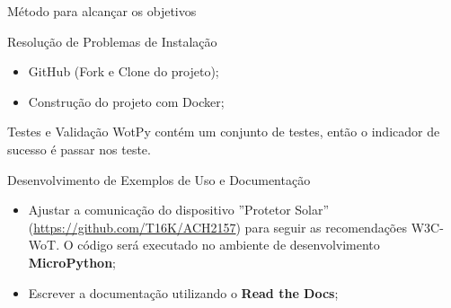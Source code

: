 \begin{frame}{Método para alcançar os objetivos}

    \begin{block}{Resolução de Problemas de Instalação}
        \begin{itemize}
            \item GitHub (Fork e Clone do projeto);
            \item Construção do projeto com Docker;
        \end{itemize}
    \end{block}

    \begin{block}{Testes e Validação}
        WotPy contém um conjunto de testes, então o indicador de sucesso é passar nos teste.
    \end{block}

    \begin{block}{Desenvolvimento de Exemplos de Uso e Documentação}
        \begin{itemize}
            \item Ajustar a comunicação do dispositivo ''Protetor Solar'' (\url{https://github.com/T16K/ACH2157}) para seguir as recomendações W3C-WoT. O código será executado no ambiente de desenvolvimento \textbf{MicroPython};
            \item Escrever a documentação utilizando o \textbf{Read the Docs};
        \end{itemize}
    \end{block}

\end{frame}